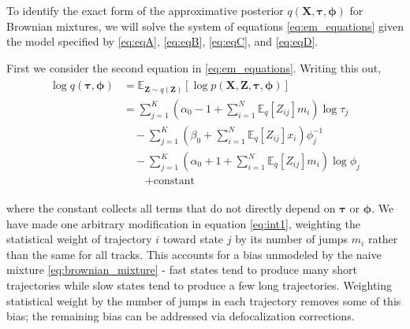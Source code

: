 \documentclass{article}
\let\vec\boldsymbol
\begin{document}
To identify the exact form of the approximative posterior $q(\vec{X}, \boldsymbol{\tau}, \boldsymbol{\phi})$ for Brownian mixtures, we will solve the system of equations \ref{eq:em_equations} given the model specified by \ref{eq:eqA}, \ref{eq:eqB}, \ref{eq:eqC}, and \ref{eq:eqD}. \newline

First we consider the second equation in \ref{eq:em_equations}. Writing this out,
\begin{align}\begin{split}\label{eq:int1}
    \log q \left( \boldsymbol{\tau}, \boldsymbol{\phi} \right) &= \mathbb{E}_{\vec{Z} \sim q(\vec{Z})} \left[ \log p \left( \vec{X}, \vec{Z}, \boldsymbol{\tau}, \boldsymbol{\phi} \right) \right] \\
    &= \sum\limits_{j=1}^{K} \left( \alpha_{0} - 1 + \sum\limits_{i=1}^{N} \mathbb{E}_{q} \left[ Z_{ij} \right] m_{i} \right) \log \tau_{j} \\
    &\quad - \sum\limits_{j=1}^{K} \left( \beta_{0} + \sum\limits_{i=1}^{N} \mathbb{E}_{q} \left[ Z_{ij} \right] x_{i} \right) \phi_{j}^{-1} \\
    &\quad - \sum\limits_{j=1}^{K} \left(
        \alpha_{0} + 1 + \sum\limits_{i=1}^{N} \mathbb{E}_{q} \left[ Z_{ij} \right] m_{i}
    \right) \log \phi_{j} \\
    &\qquad + \text{constant}
\end{split}\end{align}

where the constant collects all terms that do not directly depend
on $\boldsymbol{\tau}$ or $\boldsymbol{\phi}$. We have made one
arbitrary modification in equation \ref{eq:int1}, weighting the statistical
weight of trajectory $i$ toward state $j$ by its number of jumps $m_{i}$
rather than the same for all tracks. This accounts for a bias unmodeled
by the naive mixture \ref{eq:brownian_mixture} - fast states tend to produce
many short trajectories while slow states tend to produce a few long trajectories. Weighting statistical weight by the number of jumps in each trajectory removes some of this bias; the remaining bias can be addressed via defocalization corrections. \newline
\end{document}
